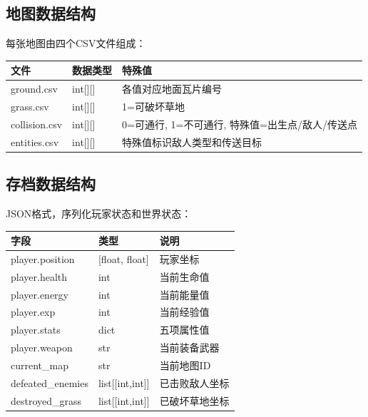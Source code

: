 \documentclass[12pt,a4paper]{article}
\begin{document}
\subsection{地图数据结构}

每张地图由四个CSV文件组成：

\begin{table}[htbp]
\centering
\begin{tabularx}{\textwidth}{lXX}
\toprule
\textbf{文件} & \textbf{数据类型} & \textbf{特殊值} \\
\midrule
ground.csv & int[][] & 各值对应地面瓦片编号 \\
grass.csv & int[][] & 1=可破坏草地 \\
collision.csv & int[][] & 0=可通行, 1=不可通行, 特殊值=出生点/敌人/传送点 \\
entities.csv & int[][] & 特殊值标识敌人类型和传送目标 \\
\bottomrule
\end{tabularx}
\end{table}

\subsection{存档数据结构}

JSON格式，序列化玩家状态和世界状态：

\begin{table}[htbp]
\centering
\begin{tabularx}{\textwidth}{lXX}
\toprule
\textbf{字段} & \textbf{类型} & \textbf{说明} \\
\midrule
player.position & [float, float] & 玩家坐标 \\
player.health & int & 当前生命值 \\
player.energy & int & 当前能量值 \\
player.exp & int & 当前经验值 \\
player.stats & dict & 五项属性值 \\
player.weapon & str & 当前装备武器 \\
current\_map & str & 当前地图ID \\
defeated\_enemies & list[[int,int]] & 已击败敌人坐标 \\
destroyed\_grass & list[[int,int]] & 已破坏草地坐标 \\
\bottomrule
\end{tabularx}
\end{table}


\end{document}
